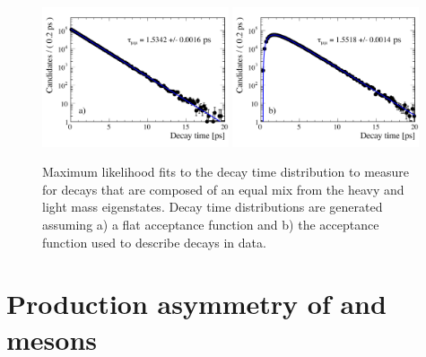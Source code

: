 \begin{figure}[tb]
  \centering
    \includegraphics[width=0.49\textwidth]{./Figs/LifetimeSystematics/No_acc_fit.pdf}
    \includegraphics[width=0.49\textwidth]{./Figs/LifetimeSystematics/Acc_fit.pdf}
  \caption{Maximum likelihood fits to the decay time distribution to measure \tmumu for \bsmumu decays that are composed of an equal mix from the heavy and light mass eigenstates. Decay time distributions are generated assuming a) a flat acceptance function and b) the acceptance function used to describe \bsmumu decays in data.}
  \label{fig:mixofstates}
\end{figure}

\section[Production asymmetry of \bs and $\overline{B}_{s}^{0}$ mesons]{Production asymmetry of \boldmath{\bs} and  mesons}
\label{sec:productionasymetry}



